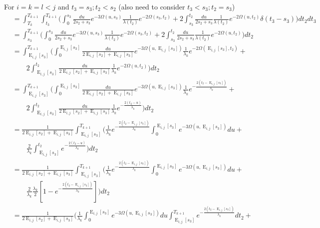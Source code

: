 \documentclass{article}
\DeclareMathOperator{\E}{E}
\begin{document}
For $i=k=l<j$ and $t_3=s_3; t_2<s_2$ (also need to consider $t_3<s_3;t_2=s_3$)
\begin{align*}
    &=\int_{T_k}^{T_{k+1}}\int_{t_3}^{T_{k+1}}\Bigg(
    \int_0^{s_3}\frac{du}{2s_2+s_3}e^{-3\Omega(u,s_3)}\frac{1}{\lambda(t_2)}e^{-2\Omega(s_3,t_2)}+
    2\int_{s_3}^{t_2}\frac{du}{2s_2+s_3}\frac{1}{\lambda(t_2)}e^{-2\Omega(u,t_2)}\delta(t_3-s_3)
    \Bigg)dt_2dt_3\\
    &=\int_{s_3}^{T_{k+1}}\Bigg(
    \int_0^{s_3}\frac{du}{2s_2+s_3}e^{-3\Omega(u,s_3)}\frac{1}{\lambda(t_2)}e^{-2\Omega(s_3,t_2)}+
    2\int_{s_3}^{t_2}\frac{du}{2s_2+s_3}\frac{1}{\lambda(t_2)}e^{-2\Omega(u,t_2)}
    \Bigg)dt_2\\
    &=\int_{\E_{i,j}[s_3]}^{T_{k+1}}\Bigg(
    \int_0^{\E_{i,j}[s_3]}\frac{du}{2\E_{i,j}[s_2]+\E_{i,j}[s_3]}e^{-3\Omega(u,\E_{i,j}[s_3])}\frac{1}{\lambda_k}e^{-2\Omega(\E_{i,j}[s_3],t_2)}+\\
    &\qquad
    2\int_{\E_{i,j}[s_3]}^{t_2}\frac{du}{2\E_{i,j}[s_2]+\E_{i,j}[s_3]}\frac{1}{\lambda_k}e^{-2\Omega(u,t_2)}
    \Bigg)dt_2\\
    &=\int_{\E_{i,j}[s_3]}^{T_{k+1}}\Bigg(
    \int_0^{\E_{i,j}[s_3]}\frac{du}{2\E_{i,j}[s_2]+\E_{i,j}[s_3]}e^{-3\Omega(u,\E_{i,j}[s_3])}\frac{1}{\lambda_k}e^{-\frac{2(t_2-\E_{i,j}[s_3])}{\lambda_k}}+\\
    &\qquad
    2\int_{\E_{i,j}[s_3]}^{t_2}\frac{du}{2\E_{i,j}[s_2]+\E_{i,j}[s_3]}\frac{1}{\lambda_k}e^{-\frac{2(t_2-u)}{\lambda_k}}
    \Bigg)dt_2\\
    &=\frac{1}{2\E_{i,j}[s_2]+\E_{i,j}[s_3]}\int_{\E_{i,j}[s_3]}^{T_{k+1}}\Bigg(
    \frac{1}{\lambda_k}e^{-\frac{2(t_2-\E_{i,j}[s_3])}{\lambda_k}}\int_0^{\E_{i,j}[s_3]}e^{-3\Omega(u,\E_{i,j}[s_3])}du+\\
    &\qquad
    \frac{2}{\lambda_k}\int_{\E_{i,j}[s_3]}^{t_2}e^{-\frac{2(t_2-u)}{\lambda_k}}
    \Bigg)dt_2\\
    &=\frac{1}{2\E_{i,j}[s_2]+\E_{i,j}[s_3]}\int_{\E_{i,j}[s_3]}^{T_{k+1}}\Bigg(
    \frac{1}{\lambda_k}e^{-\frac{2(t_2-\E_{i,j}[s_3])}{\lambda_k}}\int_0^{\E_{i,j}[s_3]}e^{-3\Omega(u,\E_{i,j}[s_3])}du+\\
    &\qquad
    \frac{2}{\lambda_k}\frac{\lambda_k}{2}\left[1-e^{-\frac{2\left(t_2-\E_{i,j}[s_3]\right)}{\lambda_k}}\right]
    \Bigg)dt_2\\
    &=\frac{1}{2\E_{i,j}[s_2]+\E_{i,j}[s_3]}\Bigg(\frac{1}{\lambda_k}\int_0^{\E_{i,j}[s_3]}e^{-3\Omega(u,\E_{i,j}[s_3])}du
    \int_{\E_{i,j}[s_3]}^{T_{k+1}}
    e^{-\frac{2(t_2-\E_{i,j}[s_3])}{\lambda_k}}dt_2+\\

\end{align*}
\end{document}
